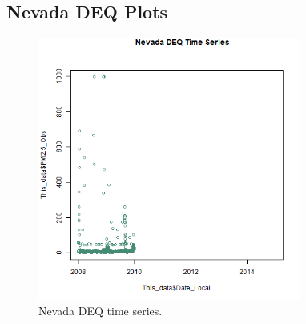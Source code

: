 
\subsection{Nevada DEQ Plots}
\begin{figure} 
\centering 
\includegraphics[width=0.77\textwidth]{Code_Outputs/NevadaDEQ_time_series.png} 
\caption{\label{fig:NevadaDEQTS}Nevada DEQ time series.} 
\end{figure} 
 
